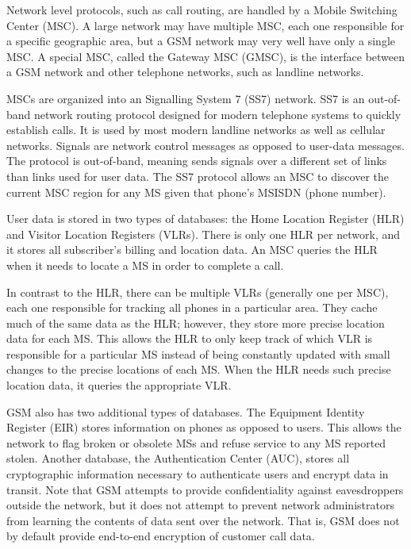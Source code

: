 \documentclass[11pt]{article}
\begin{document}
Network level protocols, such as call routing, are handled by a Mobile Switching Center (MSC). A large network may have multiple MSC, each one responsible for a specific geographic area, but a GSM network may very well have only a single MSC. A special MSC, called the Gateway MSC (GMSC), is the interface between a GSM network and other telephone networks, such as landline networks.  

MSCs are organized into an Signalling System 7 (SS7) network. SS7 is an out-of-band network routing protocol designed for modern telephone systems to quickly establish calls. It is used by most modern landline networks as well as cellular networks. Signals are network control messages as opposed to user-data messages. The protocol is out-of-band, meaning sends signals over a different set of links than links used for user data. The SS7 protocol allows an MSC to discover the current MSC region for any MS given that phone's MSISDN (phone number).

User data is stored in two types of databases: the Home Location Register (HLR) and Visitor Location Registers (VLRs). There is only one HLR per network, and it stores all subscriber's billing and location data. An MSC queries the HLR when it needs to locate a MS in order to complete a call. 

In contrast to the HLR, there can be multiple VLRs (generally one per MSC), each one responsible for tracking all phones in a particular area. They cache much of the same data as the HLR; however, they store more precise location data for each MS. This allows the HLR to only keep track of which VLR is responsible for a particular MS instead of being constantly updated with small changes to the precise locations of each MS. When the HLR needs such precise location data, it queries the appropriate VLR.

GSM also has two additional types of databases. The Equipment Identity Register (EIR) stores information on phones as opposed to users. This allows the network to flag broken or obsolete MSs and refuse service to any MS reported stolen. Another database, the Authentication Center (AUC), stores all cryptographic information necessary to authenticate users and encrypt data in transit. Note that GSM attempts to provide confidentiality against eavesdroppers outside the network, but it does not attempt to prevent network administrators from learning the contents of data sent over the network. That is, GSM does not by default provide end-to-end encryption of customer call data. %
\end{document}
